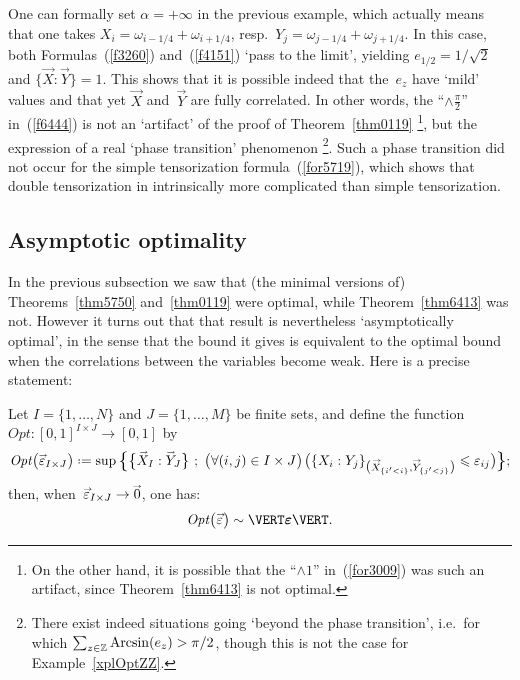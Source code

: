 \begin{Rmk}\label{rmkPhTr}
One can formally set $\alpha = +\infty$ in the previous example,
which actually means that one takes $X_i = \omega_{i-1/4} + \omega_{i+1/4}$,
resp.\ $Y_j = \omega_{j-1/4} + \omega_{j+1/4}$.
In this case, both Formulas~(\ref{f3260}) and~(\ref{f4151}) `pass to the limit',
yielding $e_{1/2} = 1/\sqrt{2}$ and $\{\vec{X}:\vec{Y}\}=1$.
This shows that it is possible indeed that the~$e_z$ have `mild' values
and that yet $\vec{X}$ and~$\vec{Y}$ are fully correlated.
%
In other words, the ``$\wedge\frac{\pi}{2}$'' in~(\ref{f6444})
is not an `artifact' of the proof of Theorem~\ref{thm0119}%
%
\footnote{\label{ftn6129}%
On the other hand, it is possible that the ``$\wedge1$'' in~(\ref{for3009})
was such an artifact, since Theorem~\ref{thm6413} is not optimal.},
%
but the expression of a real `phase transition' phenomenon%
%
\footnote{There exist indeed situations going
`beyond the phase transition', i.e.\ for which $\sum_{z\in\mathbb{Z}} \mathop{\mathrm{Arcsin}}(e_z) \allowbreak > \pi/2$,
though this is not the case for Example~\ref{xplOptZZ}.}.
%
Such a phase transition did not occur for the simple tensorization formula~(\ref{for5719}),
which shows that double tensorization in intrinsically more complicated
than simple tensorization.
\end{Rmk}


\subsection{Asymptotic optimality}\label{parAsymptoticOptimality}

In the previous subsection we saw that
(the minimal versions of) Theorems~\ref{thm5750}
and~\ref{thm0119} were optimal, while Theorem~\ref{thm6413} was not.
However it turns out that that result is nevertheless `asymptotically optimal',
in the sense that the bound it gives is equivalent to the optimal bound
when the correlations between the variables become weak.
Here is a precise statement:
%
\begin{Thm}
Let $I = \{1,\ldots,N\}$ and $J=\{1,\ldots,M\}$ be finite sets, and define
the function~$\mathit{Opt} \colon [0,1]^{I\times J} \to [0,1]$ by
\[\label{f5516}
\mathit{Opt} \big( \vec\epsilon_{I\times J} \big)
\coloneqq \sup \Big\{ \big\{ \vec{X}_I : \vec{Y}_J \big\} \ ;\ \big(\forall (i,j) \in I\times J\big) \,
\big(\{ X_i:Y_j \}_{\mathlarger{(}\vec{X}_{\{i'<i\}},\vec{Y}_{\{j'<j\}}\mathlarger{)}}
\leq \epsilon_{ij}\big) \Big\} ;\]
then, when~$\vec\epsilon_{I\times J} \longto \vec{0}$,
one has:
\[\label{f7160}
\mathit{Opt} \big(\vec\epsilon\big) \sim \VERT \boldepsilon \VERT .\]
\end{Thm}


